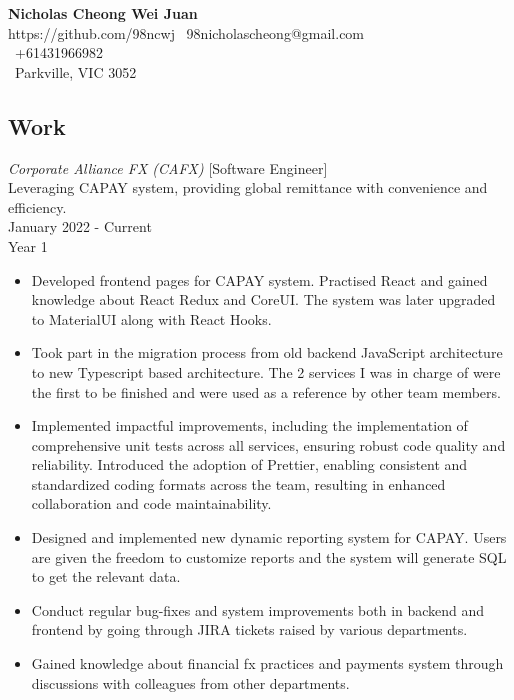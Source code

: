\documentclass[10pt, a4paper]{cv}
\begin{document}
\noindent
{\LARGE \textbf{Nicholas Cheong Wei Juan}} \\
\noindent
{} https://github.com/98ncwj \hspace{25pt}
\faEnvelope\ 98nicholascheong@gmail.com  \\
\faPhone\ +61431966982 \\
\faHome\ Parkville, VIC 3052
\begin{paracol}{2}
	\begin{flushleft}

		\section*{Work}
		 {\sl Corporate Alliance FX (CAFX) } [Software Engineer] \\
		Leveraging CAPAY system, providing global remittance with convenience and efficiency.\\
		January 2022 - Current \\
		\vspace{6pt}
		\quad Year 1
		\begin{itemize}[ topsep=0pt] \itemsep -2pt
			\item Developed frontend pages for CAPAY system. Practised React and gained knowledge about React Redux and CoreUI. The system was later upgraded to MaterialUI along with React Hooks.
			\item Took part in the migration process from old backend JavaScript architecture to new Typescript based architecture. The 2 services I was in charge of were the first to be finished and were used as a reference by other team members.
			\item Implemented impactful improvements, including the implementation of comprehensive unit tests across all services, ensuring robust code quality and reliability. Introduced the adoption of Prettier, enabling consistent and standardized coding formats across the team, resulting in enhanced collaboration and code maintainability.
			\item Designed and implemented new dynamic reporting system for CAPAY. Users are given the freedom to customize reports and the system will generate SQL to get the relevant data.
			\item Conduct regular bug-fixes and system improvements both in backend and frontend by going through JIRA tickets raised by various departments.
			\item Gained knowledge about financial fx practices and payments system through discussions with colleagues from other departments.

\end{itemize}
\end{flushleft}
\end{paracol}
\end{document}
